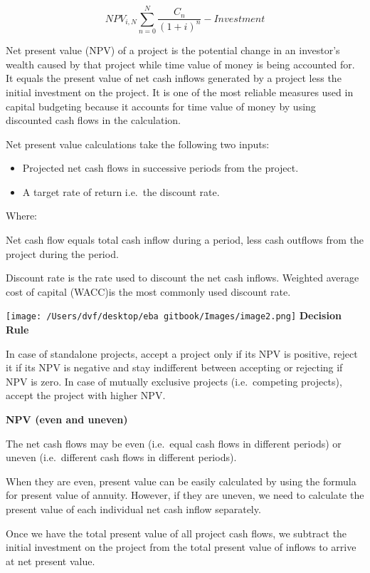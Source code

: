 \documentclass[]{book}
\theoremstyle{definition}
\theoremstyle{definition}
\theoremstyle{definition}
\theoremstyle{remark}
\begin{document}
\[NPV_{i, N}  \sum_{n=0}^{N}\frac{C_n}{(1+i)^n} - Investment\]

Net present value (NPV) of a project is the potential change in an
investor's wealth caused by that project while time value of money is
being accounted for. It equals the present value of net cash inflows
generated by a project less the initial investment on the project. It is
one of the most reliable measures used in capital budgeting because it
accounts for time value of money by using discounted cash flows in the
calculation.

Net present value calculations take the following two inputs:

\begin{itemize}
\item
  Projected net cash flows in successive periods from the project.
\item
  A target rate of return i.e.~the discount rate.
\end{itemize}

Where:

Net cash flow equals total cash inflow during a period, less cash
outflows from the project during the period.

Discount rate is the rate used to discount the net cash inflows.
Weighted average cost of capital (WACC)is the most commonly used
discount rate.

\texttt{[image: /Users/dvf/desktop/eba gitbook/Images/image2.png]}
\textbf{Decision Rule}

In case of standalone projects, accept a project only if its NPV is
positive, reject it if its NPV is negative and stay indifferent between
accepting or rejecting if NPV is zero. In case of mutually exclusive
projects (i.e.~competing projects), accept the project with higher NPV.

\textbf{NPV (even and uneven)}

The net cash flows may be even (i.e.~equal cash flows in different
periods) or uneven (i.e.~different cash flows in different periods).

When they are even, present value can be easily calculated by using the
formula for present value of annuity. However, if they are uneven, we
need to calculate the present value of each individual net cash inflow
separately.

Once we have the total present value of all project cash flows, we
subtract the initial investment on the project from the total present
value of inflows to arrive at net present value.
\end{document}

